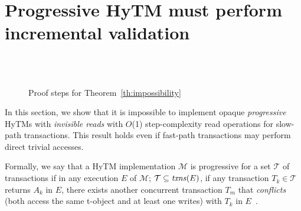 \section{Progressive HyTM must perform incremental validation}
\label{sec:lb}
%
%
\begin{figure*}[!t]
\begin{center}
        \\
        \vspace{1mm}
	\\
	\vspace{1mm}
	\caption{Proof steps for Theorem~\ref{th:impossibility}
        \label{fig:indis}} 
\end{center}
\end{figure*}
%
In this section, we show that it is impossible to implement opaque \emph{progressive} HyTMs with \emph{invisible reads}
with $O$(1) step-complexity read operations for slow-path transactions. 
This result holds even if fast-path transactions may perform
direct trivial accesses.

Formally, we say that a HyTM implementation $\mathcal{M}$ is progressive
for a set $\mathcal{T}$ of transactions
if in any execution $E$ of $\mathcal{M}$; $\mathcal{T} \subseteq \ms{txns}(E)$, 
if any transaction $T_k \in \mathcal{T}$ returns $A_k$ in $E$, there exists 
another concurrent transaction $T_m$ that \emph{conflicts} (both access the same t-object and at least one writes) with $T_k$ in $E$~\cite{tm-book}.

